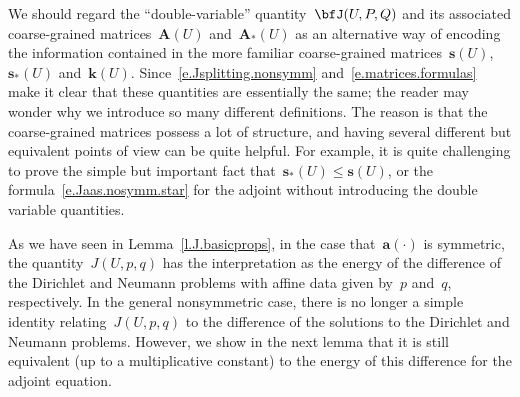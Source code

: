 \documentclass[11pt,twoside]{article} %
\numberwithin{equation}{section}
\theoremstyle{definition}
\newcommand{\s}{\mathbf{s}}
\renewcommand{\a}{\mathbf{a}}
\renewcommand{\k}{\mathbf{k}}
\newcommand{\bfA}{\mathbf{A}}
\begin{document}
We should regard the ``double-variable'' quantity~$\bfJ(U,P,Q)$ and its associated coarse-grained matrices~$\bfA(U)$ and~$\bfA_*(U)$ as an alternative way of encoding the information contained in the more familiar coarse-grained matrices~$\s(U)$,~$\s_*(U)$ and~$\k(U)$. Since~\eqref{e.Jsplitting.nonsymm} and~\eqref{e.matrices.formulas} make it clear that these quantities are essentially the same; the reader may wonder why we introduce so many different definitions. The reason is that the coarse-grained matrices possess a lot of structure, and having several different but equivalent points of view can be quite helpful.
For example, it is quite challenging to prove the simple but important fact that~$\s_*(U) \leq \s(U)$, or the formula~\eqref{e.Jaas.nosymm.star} for the adjoint without introducing the double variable quantities. 




\smallskip





As we have seen in Lemma~\ref{l.J.basicprops}, in the case that~$\a(\cdot)$ is symmetric, the quantity~$J(U,p,q)$ has the interpretation as the energy of the difference of the Dirichlet and Neumann problems with affine data given by~$p$ and~$q$, respectively. In the general nonsymmetric case, 
there is no longer a simple identity relating~$J(U,p,q)$ to the difference of the solutions to the Dirichlet and Neumann problems. However, we show in the next lemma that it is still equivalent (up to a multiplicative constant) to the energy of this difference for the adjoint equation.  
\end{document}
